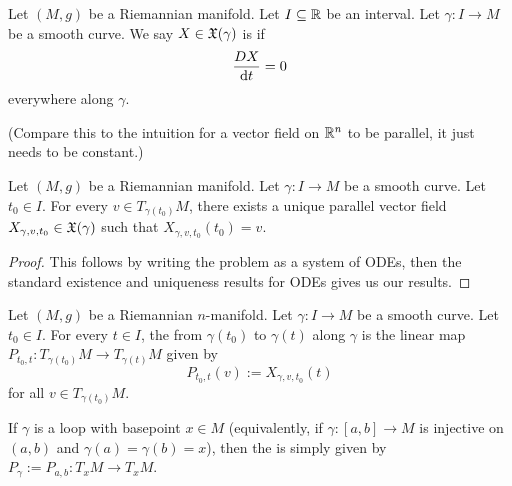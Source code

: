\begin{definition}
Let $(M,g)$ be a Riemannian manifold. Let $I\subseteq\mathbb{R}$ be an
interval. Let $\gamma\colon I\to M$ be a smooth curve.
We say $X\in\mathfrak{X}(\gamma)$ is  if
\begin{equation}
\frac{DX}{\mathrm{d} t}=0
\end{equation}
everywhere along $\gamma$.

(Compare this to the intuition for a vector field on $\mathbb{R}^{n}$ to be
parallel, it just needs to be constant.)
\end{definition}

\begin{proposition}
Let $(M,g)$ be a Riemannian manifold. Let $\gamma\colon I\to M$ be a
smooth curve. Let $t_{0}\in I$. For every $v\in T_{\gamma(t_{0})}M$,
there exists a unique parallel vector field $X_{\gamma,v,t_{0}}\in\mathfrak{X}(\gamma)$
such that $X_{\gamma,v,t_{0}}(t_{0})=v$.
\end{proposition}

\begin{proof}
This follows by writing the problem as a system of ODEs, then the
standard existence and uniqueness results for ODEs gives us our results.
\end{proof}

\begin{definition}
Let $(M,g)$ be a Riemannian $n$-manifold. Let $\gamma\colon I\to M$ be
a smooth curve. Let $t_{0}\in I$. For every $t\in I$, the
 from $\gamma(t_{0})$ to $\gamma(t)$ along
$\gamma$ is the linear map $P_{t_{0},t}\colon T_{\gamma(t_{0})}M\to T_{\gamma(t)}M$
given by
\begin{equation}
P_{t_{0},t}(v):=X_{\gamma,v,t_{0}}(t)
\end{equation}
for all $v\in T_{\gamma(t_{0})}M$.

If $\gamma$ is a loop with basepoint $x\in M$ (equivalently, if
$\gamma\colon[a,b]\to M$ is injective on $(a,b)$ and $\gamma(a)=\gamma(b)=x$),
then the  is simply given by
$P_{\gamma}:=P_{a,b}\colon T_{x}M\to T_{x}M$.
\end{definition}

